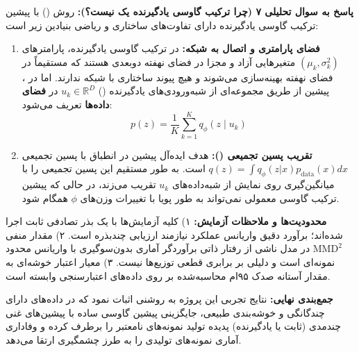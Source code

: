 \textbf{پاسخ به سوال تحلیلی ۷ (چرا ترکیب گاوسی یادگیرنده یک  نیست؟):}
روش  (\cite{tomczak2018vampprior}) با پیشین ترکیب گاوسی یادگیرنده دارای تفاوت‌های ساختاری و ریاضی بنیادین زیر است:
\begin{enumerate}
  \item \textbf{فضای پارامتری و اتصال به شبکه:} در ترکیب گاوسی یادگیرنده، پارامترهای $(\mu_k, \sigma_k^2)$ متغیرهایی آزاد و مجزا در فضای نهفته دوبعدی هستند که مستقیماً در فضای نهفته بهینه‌سازی می‌شوند و هیچ پیوند ساختاری با شبکه  ندارند. اما در ، پیشین از طریق مجموعه‌ای از شبه‌ورودی‌های یادگیرنده () $u_k \in \mathbb{R}^{D}$ در \textbf{فضای داده‌ها} تعریف می‌شود:
  \begin{equation}
    p(z) = \frac{1}{K}\sum_{k=1}^K q_\phi(z \mid u_k)
  \end{equation}
  \item \textbf{تقریب پسین تجمیعی ():} هدف ایده‌آل پیشین در  انطباق با پسین تجمیعی $q(z) = \int q_\phi(z|x)p_{\text{data}}(x)dx$ است.  به طور مستقیم این پسین تجمیعی را با میانگین‌گیری روی نمایش  از شبه‌داده‌های $u_k$ تقریب می‌زند، در حالی که پیشین ترکیب گاوسی معمولی نمی‌تواند به طور پویا با تغییرات وزن‌های  $\phi$ همگام شود.
\end{enumerate}

\textbf{محدودیت‌ها و ملاحظات آزمایش:}
۱) کلیه آزمایش‌ها با یک بذر تصادفی ثابت اجرا شده‌اند؛ برآورد دقیق واریانس عملکرد نیازمند ارزیابی چندبذره است.
۲) مقدار منفی $\text{MMD}^2$ در مدل  ناشی از رفتار ذاتی برآوردگر آماری بدون‌سوگیری با واریانس محدود نمونه‌ای است و دلیلی بر برابری قطعی توزیع‌ها نیست.
۳) معیار اعتبار خوشه‌ای به مقدار آستانه صدک ۹۵ام محاسبه‌شده بر روی داده‌های اعتبارسنجی وابسته است.

\textbf{جمع‌بندی نهایی:} نتایج تجربی این پروژه به روشنی اثبات نمود که در داده‌های دارای چندگانگی و خوشه‌بندی طبیعی، جایگزینی پیشین گاوسی ساده با پیشین‌های غنی چندمدی (ثابت یا یادگیرنده) پدیده تولید نمونه‌های نامعتبر را برطرف کرده و وفاداری آماری نمونه‌های تولیدی را به طرز چشمگیری ارتقا می‌دهد.
